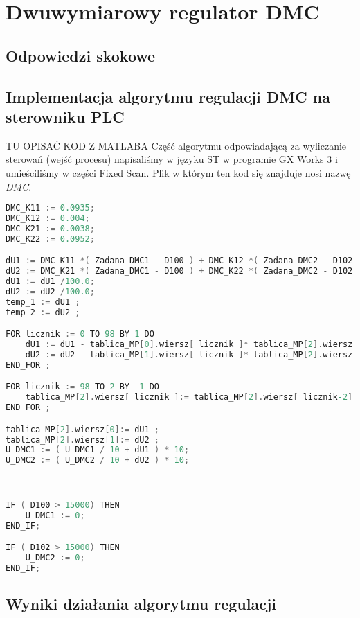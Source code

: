 \chapter{Dwuwymiarowy regulator DMC}
\label{thermal_dmc}


\section{Odpowiedzi skokowe}
\label{thermal_dmc_odp_skok}


\section{Implementacja algorytmu regulacji DMC na sterowniku PLC}
\label{thermal_dmc_impl}
TU OPISAĆ KOD Z MATLABA
Część algorytmu odpowiadającą za wyliczanie sterowań (wejść procesu) napisaliśmy w języku ST w programie GX Works 3 i umieściliśmy w części Fixed Scan. Plik w którym ten kod się znajduje nosi nazwę \textit{DMC}.
\begin{lstlisting}[caption={Kod obliczający sterownanie dla regulatora dwuwymiarowego DMC (GX Works)}, language=C]
DMC_K11 := 0.0935;
DMC_K12 := 0.004;
DMC_K21 := 0.0038;
DMC_K22 := 0.0952;

dU1 := DMC_K11 *( Zadana_DMC1 - D100 ) + DMC_K12 *( Zadana_DMC2 - D102 ) ;
dU2 := DMC_K21 *( Zadana_DMC1 - D100 ) + DMC_K22 *( Zadana_DMC2 - D102 ) ;
dU1 := dU1 /100.0;
dU2 := dU2 /100.0;
temp_1 := dU1 ;
temp_2 := dU2 ;

FOR licznik := 0 TO 98 BY 1 DO
	dU1 := dU1 - tablica_MP[0].wiersz[ licznik ]* tablica_MP[2].wiersz[ licznik ];
	dU2 := dU2 - tablica_MP[1].wiersz[ licznik ]* tablica_MP[2].wiersz[ licznik ];
END_FOR ;

FOR licznik := 98 TO 2 BY -1 DO
	tablica_MP[2].wiersz[ licznik ]:= tablica_MP[2].wiersz[ licznik-2];
END_FOR ;

tablica_MP[2].wiersz[0]:= dU1 ;
tablica_MP[2].wiersz[1]:= dU2 ;
U_DMC1 := ( U_DMC1 / 10 + dU1 ) * 10; 
U_DMC2 := ( U_DMC2 / 10 + dU2 ) * 10; 



IF ( D100 > 15000) THEN
	U_DMC1 := 0;
END_IF;

IF ( D102 > 15000) THEN
	U_DMC2 := 0;
END_IF;
\end{lstlisting}

\section{Wyniki działania algorytmu regulacji}
\label{thermal_dmc_wyniki}

